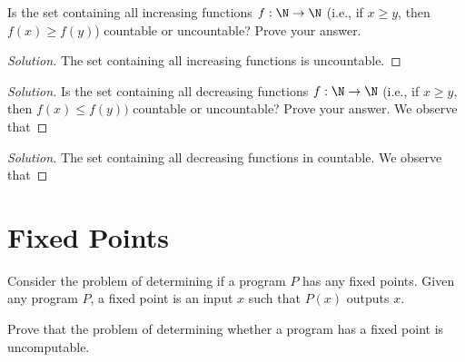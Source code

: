 \documentclass{article}
\newenvironment{solution}{\begin{proof}[Solution]}{\end{proof}}
\begin{document}
\begin{hw}
	Is the set containing all increasing functions $f : \N \rightarrow \N$ (i.e., if $x \geq y $, then $f(x) \geq f(y)$) countable or uncountable? Prove your answer.
\end{hw}
\begin{solution}
	The set containing all increasing functions is uncountable.
\end{solution}

\begin{solution}
	Is the set containing all decreasing functions $f : \N \rightarrow \N$ (i.e., if $x \geq y$, then $f(x) \leq f(y))$ countable or uncountable? Prove your answer. We observe that
\end{solution}
\begin{solution}
	The set containing all decreasing functions in countable. We observe that 
\end{solution}

\newpage

\section{Fixed Points}
Consider the problem of determining if a program $P$ has any fixed points. Given any program $P$, a fixed point is an input $x$ such that $P(x)$ outputs $x$.  

\begin{hw}
	Prove that the problem of determining whether a program has a fixed point is uncomputable.
\end{hw}
\end{document}
